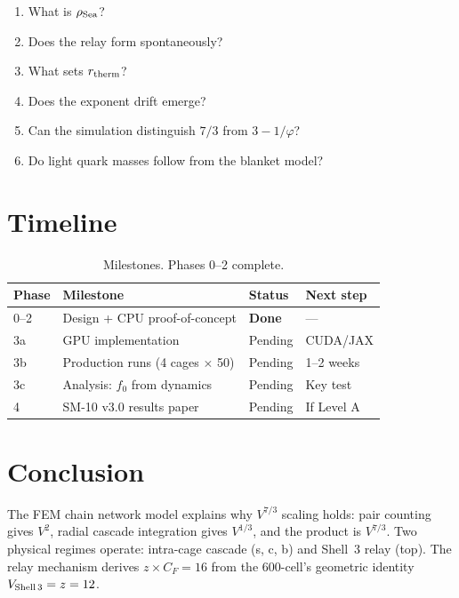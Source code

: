 \documentclass[11pt,letterpaper]{article}
\newcommand{\phig}{\varphi}
\begin{document}
\begin{enumerate}
\item What is $\rho_{\rm Sea}$?
\item Does the relay form spontaneously?
\item What sets $r_{\rm therm}$?
\item Does the exponent drift emerge?
\item Can the simulation distinguish $7/3$ from $3 - 1/\phig$?
\item Do light quark masses follow from the blanket model?
\end{enumerate}

\section{Timeline}

\begin{table}[H]
\centering
\caption{Milestones.  Phases 0--2 complete.}
\begin{tabular}{@{}llll@{}}
\toprule
Phase & Milestone & Status & Next step \\
\midrule
0--2 & Design + CPU proof-of-concept & \textbf{Done} & --- \\
3a & GPU implementation & Pending & CUDA/JAX \\
3b & Production runs (4 cages $\times$ 50) & Pending & 1--2 weeks \\
3c & Analysis: $f_0$ from dynamics & Pending & Key test \\
4 & SM-10 v3.0 results paper & Pending & If Level A \\
\bottomrule
\end{tabular}
\end{table}

\section{Conclusion}

The FEM chain network model explains why $V^{7/3}$ scaling holds:
pair counting gives $V^2$, radial cascade integration gives
$V^{1/3}$, and the product is $V^{7/3}$.  Two physical regimes
operate: intra-cage cascade (s, c, b) and Shell~3 relay (top).
The relay mechanism derives $z \times C_F = 16$ from the
600-cell's geometric identity $V_{\rm Shell\,3} = z = 12$.
\end{document}
